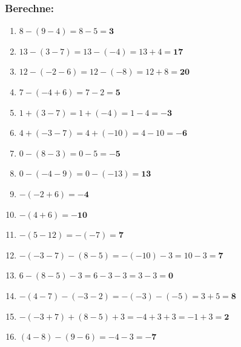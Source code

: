 \documentclass[a4paper,10pt]{article} %
\begin{document}
\subsubsection{Berechne:} %

\begin{enumerate}

  \item \(8 - (9 - 4) =
    8 - 5 =
    \mathbf{3}\) %

  \item \(13 - (3 - 7) =
    13 - (-4) =
    13 + 4 =
    \mathbf{17}\) %

  \item \(12 - (-2 - 6) =
    12 - (-8) =
    12 + 8 =
    \mathbf{20}\) %

  \item \(7 - (-4 + 6) =
    7 - 2 =
    \mathbf{5}\) %

  \item \(1 + (3 - 7) =
    1 + (-4) =
    1 - 4 =
    \mathbf{-3}\) %

  \item \(4 + (-3 - 7) =
    4 + (-10) =
    4 - 10 =
    \mathbf{-6}\) %

  \item \(0 - (8 - 3) =
    0 - 5 =
    \mathbf{-5}\) %

  \item \(0 - (-4 - 9) =
    0 - (-13) =
    \mathbf{13}\) %

  \item \(-(-2 + 6) =
    \mathbf{-4}\) %

  \item \(-(4 + 6) =
    \mathbf{-10}\) %

  \item \(-(5 - 12) =
    -(-7) =
    \mathbf{7}\) %

  \item \(-(-3 - 7) - (8 - 5) =
    -(-10) - 3 =
    10 - 3 =
    \mathbf{7}\) %

  \item \(6 - (8 - 5) - 3 =
    6 - 3 - 3 =
    3 - 3 =
    \mathbf{0}\) %

  \item \(-(4 - 7) - (-3 - 2) =
    -(-3) - (-5) =
    3 + 5 =
    \mathbf{8}\) %

  \item \(-(-3 + 7) + (8 - 5) + 3 =
    -4 + 3 + 3 =
    -1 + 3 =
    \mathbf{2}\) %

  \item \((4 - 8) - (9 - 6) =
    -4 - 3 =
    \mathbf{-7}\) %


\end{enumerate}
\end{document}
